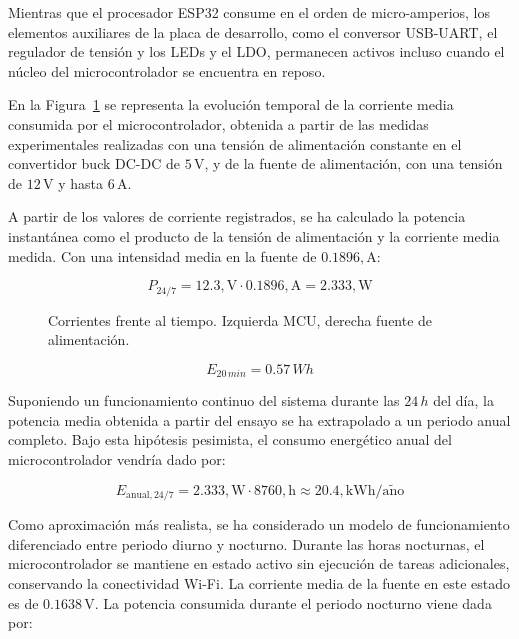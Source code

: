 Mientras que el procesador ESP32 consume en el orden de micro-amperios, los elementos auxiliares de la placa de desarrollo, como el conversor USB-UART, el regulador de tensión y los LEDs y el LDO, permanecen activos incluso cuando el núcleo del microcontrolador se encuentra en reposo.

En la Figura~\ref{fig:corriente_tiempo} se representa la evolución temporal de la corriente media consumida por el microcontrolador, obtenida a partir de las medidas experimentales realizadas con una tensión de alimentación constante en el convertidor buck DC-DC de $5\,\mathrm{V}$, y de la fuente de alimentación, con una tensión de $12\,\mathrm{V}$ y hasta $6\,\mathrm{A}$. 

A partir de los valores de corriente registrados, se ha calculado la potencia instantánea como el producto de la tensión de alimentación y la corriente media medida. Con una intensidad media en la fuente de $0.1896,\mathrm{A}$:

\begin{equation}
	P_{\mathrm{24/7}} = 12.3,\mathrm{V} \cdot 0.1896,\mathrm{A}
	= 2.333,\mathrm{W}
\end{equation}

\begin{figure}[h]
	\centering
		
	\caption{Corrientes frente al tiempo. Izquierda MCU, derecha fuente de alimentación.}
	\label{fig:corriente_tiempo}
\end{figure}

\begin{equation}
	E_{20\, min} = 0.57\, Wh
\end{equation}


Suponiendo un funcionamiento continuo del sistema durante las $24\, h$ del día, la potencia media obtenida a partir del ensayo se ha extrapolado a un periodo anual completo. Bajo esta hipótesis pesimista, el consumo energético anual del microcontrolador vendría dado por:

\begin{equation}
	E_{\mathrm{anual,24/7}} = 2.333,\mathrm{W} \cdot 8760,\mathrm{h} \approx 20.4,\mathrm{kWh/a\tilde{n}o}
\end{equation}

Como aproximación más realista, se ha considerado un modelo de funcionamiento diferenciado entre periodo diurno y nocturno. Durante las horas nocturnas, el microcontrolador se mantiene en estado activo sin ejecución de tareas adicionales, conservando la conectividad Wi-Fi. La corriente media de la fuente en este estado es de $0.1638\, \mathrm{V}$. La potencia consumida durante el periodo nocturno viene dada por:

